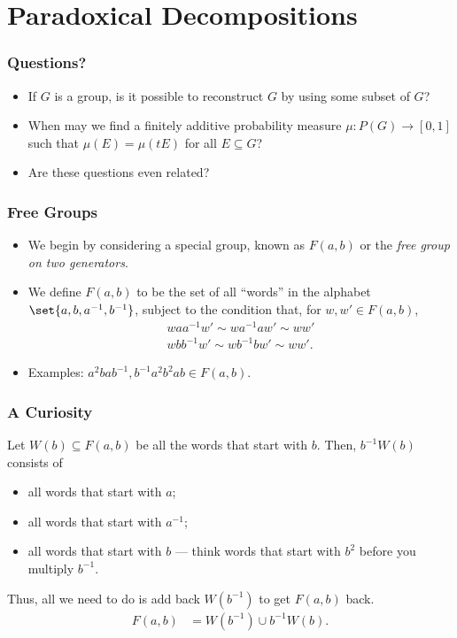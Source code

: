 \documentclass{beamer-custom}
\begin{document}
\section{Paradoxical Decompositions}%
\begin{frame}
  \frametitle{Questions?}
  \begin{itemize}
    \item If $G$ is a group, is it possible to reconstruct $G$ by using some subset of $G$?
    \item When may we find a finitely additive probability measure $\mu\colon P(G)\rightarrow [0,1]$ such that $\mu\left( E \right) = \mu\left( tE \right)$ for all $E\subseteq G$?
    \item Are these questions even related?
  \end{itemize}
\end{frame}
\begin{frame}
  \frametitle{Free Groups}
  \begin{itemize}
    \item We begin by considering a special group, known as $F(a,b)$ or the \textit{free group on two generators}.\pause
    \item We define $F(a,b)$ to be the set of all ``words'' in the alphabet $\set{a,b,a^{-1},b^{-1}}$, subject to the condition that, for $w,w'\in F(a,b)$,
      \begin{align*}
        waa^{-1}w' \sim wa^{-1}aw' \sim ww'\\
        wbb^{-1}w' \sim wb^{-1}bw' \sim ww'.
      \end{align*}
    \item Examples: $a^2bab^{-1},b^{-1}a^2b^2ab\in F(a,b)$.
  \end{itemize}
\end{frame}
\begin{frame}
  \frametitle{A Curiosity}
  Let $W(b)\subseteq F(a,b)$ be all the words that start with $b$. Then, $b^{-1}W(b)$ consists of \pause
  \begin{itemize}
    \item all words that start with $a$;
    \item all words that start with $a^{-1}$;
    \item all words that start with $b$ --- think words that start with $b^2$ before you multiply $b^{-1}$.\pause
  \end{itemize}
  Thus, all we need to do is add back $W\left( b^{-1} \right)$ to get $F(a,b)$ back.
  \begin{align*}
    F(a,b) &= W\left( b^{-1} \right)\cup b^{-1}W(b).
  \end{align*}\pause
\end{frame}
\end{document}
